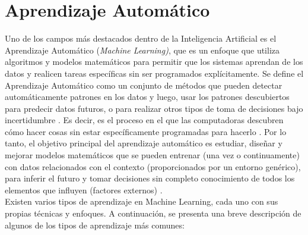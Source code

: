 \section{Aprendizaje Automático}
Uno de los campos más destacados dentro de la Inteligencia Artificial es el Aprendizaje Automático (\textit{Machine Learning)}, que es un enfoque que utiliza algoritmos y modelos matemáticos para permitir que los sistemas aprendan de los datos y realicen tareas específicas sin ser programados explícitamente. Se define el Aprendizaje Automático como un conjunto de métodos que pueden detectar automáticamente patrones en los datos y luego, usar los patrones descubiertos para predecir datos futuros, o para realizar otros tipos de toma de decisiones bajo incertidumbre \citep{murphy2012machine}. Es decir, es el proceso en el que las computadoras descubren cómo hacer cosas sin estar específicamente programadas para hacerlo \citep{Praba2021}. Por lo tanto, el objetivo principal del aprendizaje automático es estudiar, diseñar y mejorar modelos matemáticos que se pueden entrenar (una vez o continuamente) con datos relacionados con el contexto (proporcionados por un entorno genérico), para inferir el futuro y tomar decisiones sin completo conocimiento de todos los elementos que influyen (factores externos) \citep{bonaccorso2017machine}. \\
Existen varios tipos de aprendizaje en Machine Learning, cada uno con sus propias técnicas y enfoques. A continuación, se presenta una breve descripción de algunos de los tipos de aprendizaje más comunes:
